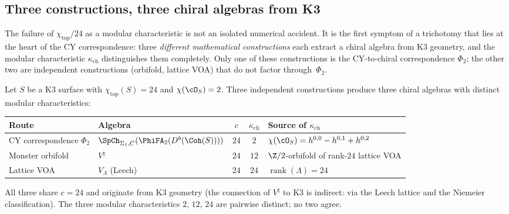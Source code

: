 \subsection{Three constructions, three chiral algebras from K3}
\label{subsec:k3-three-algebraizations} %


The failure of $\chi_{\mathrm{top}}/24$ as a modular characteristic is not an isolated
numerical accident. It is the first symptom of a trichotomy that lies at the heart
of the CY correspondence: three \emph{different mathematical constructions} each extract
a chiral algebra from K3 geometry, and the modular
characteristic $\kappa_{\mathrm{ch}}$ distinguishes them completely.
Only one of these constructions is the CY-to-chiral correspondence $\Phi_2$; the other two
are independent constructions (orbifold, lattice VOA) that do not factor
through~$\Phi_2$.

\begin{proposition}
\label{prop:k3-trichotomy}
Let $S$ be a K3 surface with $\chi_{\mathrm{top}}(S) = 24$ and $\chi(\cO_S) = 2$. Three independent constructions produce three chiral algebras with distinct modular characteristics:
\begin{center}
\renewcommand{\arraystretch}{1.4}
\begin{tabular}{llccl}
 \toprule
 \textbf{Route} & \textbf{Algebra} & $c$ & $\kappa_{\mathrm{ch}}$ & \textbf{Source of $\kappa_{\mathrm{ch}}$} \\
 \midrule
 CY correspondence $\Phi_2$ & $\SpCh_{\Sigma_1, C}(\PhiFA_2(D^b(\Coh(S))))$ & $24$ & $2$ & $\chi(\cO_S) = h^{0,0} - h^{0,1} + h^{0,2}$ \\
 Monster orbifold & $V^\natural$ & $24$ & $12$ & $\Z/2$-orbifold of rank-$24$ lattice VOA \\
 Lattice VOA & $V_\Lambda$ (Leech) & $24$ & $24$ & $\operatorname{rank}(\Lambda) = 24$ \\
 \bottomrule
\end{tabular}
\end{center}
All three share $c = 24$ and originate from K3 geometry (the connection of $V^\natural$ to K3 is indirect: via the Leech lattice and the Niemeier classification). The three modular characteristics $2$, $12$, $24$ are pairwise distinct; no two agree.
\end{proposition}

